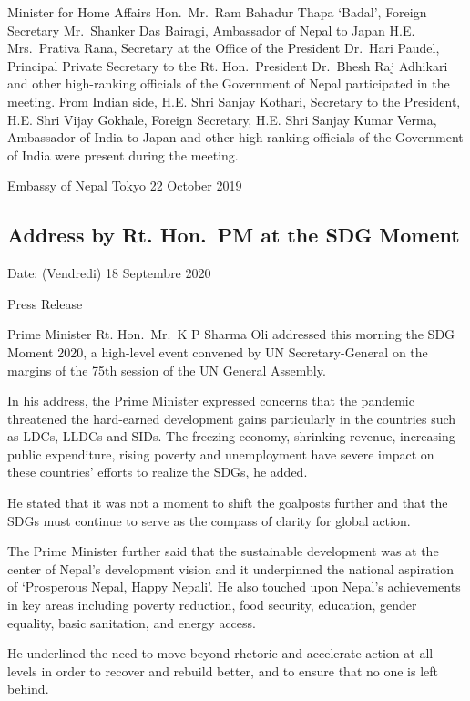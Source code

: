 \documentclass[
  openany]{book}
\begin{document}
Minister for Home Affairs Hon.~Mr.~Ram Bahadur Thapa `Badal', Foreign Secretary Mr.~Shanker Das Bairagi, Ambassador of Nepal to Japan H.E. Mrs.~Prativa Rana, Secretary at the Office of the President Dr.~Hari Paudel, Principal Private Secretary to the Rt. Hon.~President Dr.~Bhesh Raj Adhikari and other high-ranking officials of the Government of Nepal participated in the meeting. From Indian side, H.E. Shri Sanjay Kothari, Secretary to the President, H.E. Shri Vijay Gokhale, Foreign Secretary, H.E. Shri Sanjay Kumar Verma, Ambassador of India to Japan and other high ranking officials of the Government of India were present during the meeting.

Embassy of Nepal
Tokyo
22 October 2019

\hypertarget{address-by-rt.-hon.-pm-at-the-sdg-moment}{%
\subsection{Address by Rt. Hon.~PM at the SDG Moment}\label{address-by-rt.-hon.-pm-at-the-sdg-moment}}

Date: (Vendredi) 18 Septembre 2020

Press Release

Prime Minister Rt. Hon.~Mr.~K P Sharma Oli addressed this morning the SDG Moment 2020, a high-level event convened by UN Secretary-General on the margins of the 75th session of the UN General Assembly.

In his address, the Prime Minister expressed concerns that the pandemic threatened the hard-earned development gains particularly in the countries such as LDCs, LLDCs and SIDs. The freezing economy, shrinking revenue, increasing public expenditure, rising poverty and unemployment have severe impact on these countries' efforts to realize the SDGs, he added.

He stated that it was not a moment to shift the goalposts further and that the SDGs must continue to serve as the compass of clarity for global action.

The Prime Minister further said that the sustainable development was at the center of Nepal's development vision and it underpinned the national aspiration of `Prosperous Nepal, Happy Nepali'. He also touched upon Nepal's achievements in key areas including poverty reduction, food security, education, gender equality, basic sanitation, and energy access.

He underlined the need to move beyond rhetoric and accelerate action at all levels in order to recover and rebuild better, and to ensure that no one is left behind.
\end{document}
